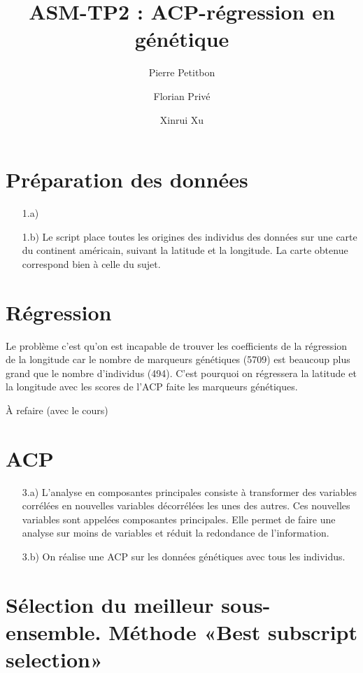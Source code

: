 \documentclass[a4paper, 12pt]{article}
\title{ASM-TP2 : ACP-régression en génétique}
\author{Pierre Petitbon \and Florian Privé \and Xinrui Xu}
\date{}
\begin{document}
\maketitle

\section{Préparation des données}

\begin{enumerate}
\setlength{\itemsep}{20pt}

\item[1.a)] 
\item[1.b)] 
Le script place toutes les origines des individus des données sur une carte du continent américain, suivant la latitude et la longitude. La carte obtenue correspond bien à celle du sujet. 
\end{enumerate}



\section{Régression}
Le problème c'est qu'on est incapable de trouver les coefficients de la régression de la longitude car le nombre de marqueurs génétiques (5709) est beaucoup plus grand que le nombre d'individus (494). C'est pourquoi on régressera la latitude et la longitude avec les scores de l'ACP faite les marqueurs génétiques. 

À refaire (avec le cours)

\section{ACP}
\begin{enumerate}
\setlength{\itemsep}{20pt}
\item[3.a)]
 L'analyse en composantes principales consiste à transformer des variables corrélées en nouvelles variables décorrélées les unes des autres. Ces nouvelles variables sont appelées composantes principales. Elle permet de faire une analyse sur moins de variables et réduit la redondance de l'information. 

 \item[3.b)]
 On réalise une ACP sur les données génétiques avec tous les individus.

\end{enumerate}


\section{Sélection du meilleur sous-ensemble. Méthode «Best subscript selection»}
\end{document}
